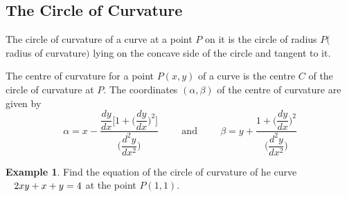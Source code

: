 \documentclass[11pt,a4paper]{article}
\theoremstyle{definition}
\newtheorem{exa}[thm]{Example}
\begin{document}
\subsection{The Circle of Curvature}
The circle of curvature of a curve at a point $P$ on it is the circle of radius $P($ radius of curvature$)$ lying on the concave side of the circle and tangent to it.


\begin{figure}[H]
\centering
{}
\end{figure}

The centre of curvature for a point $P(x,y)$ of a curve is the centre $C$ of the circle of curvature at $P$. The coordinates $(\alpha , \beta)$ of the centre of curvature are given by 
$$\alpha =  x - \frac{\dfrac{dy}{dx}\Big[1 +\Big(\dfrac{dy}{dx}\Big)^2\Big] }{\Big(\dfrac{d^2y}{dx^2}\Big)}\hspace{1cm}\text{and} \hspace{1cm} \beta = y+ \frac{1 + \Big(\dfrac{dy}{dx}\Big)^2}{\Big(\dfrac{d^2y}{dx^2}\Big)}$$


\begin{exa}


Find the equation of the circle of curvature of he curve $\hspace{0.3cm} 2xy + x + y = 4$ at the point $P(1,1)$.
\end{exa}
\end{document}
